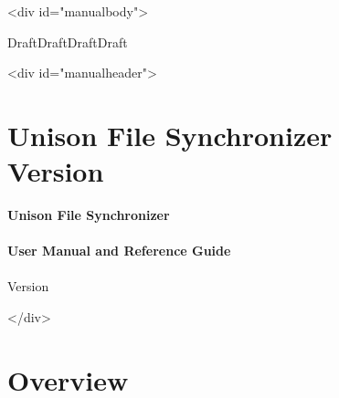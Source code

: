 \documentclass{article}
\begin{document}
\ifhevea\begin{rawhtml}<div id="manualbody">\end{rawhtml}\fi

\ifhevea\else\bigskip\fi%
\ifdraft%
\begin{center}%
{\Huge \ifhevea\red\fi DraftDraftDraftDraft}%
\end{center}%
\ifhevea\else \bigskip \fi
\fi

\ifhevea\begin{rawhtml}<div id="manualheader">\end{rawhtml}%
\else \thispagestyle{empty}
\fi%
%
\iftextversion
  \section*{Unison File Synchronizer 
  \\
  Version
  \unisonversion 
  }
\else%
  \ifhevea\else \vspace*{2in} \fi%
  \begin{center}%
  \Huge{\ifhevea\black\else\bf \fi Unison File  Synchronizer}%
  \ifhevea \\ \else \\[2ex] \fi%
  \huge {\ifhevea\black\else\bf \fi User Manual and Reference Guide}%
  \ifhevea \\ \else \\[6ex] \fi%
  \LARGE%
  Version \unisonversion \\ %
  \end{center}%
\fi%
%
%
\ifhevea\begin{rawhtml}</div>\end{rawhtml}\fi

\ifhevea\else\newpage\fi 
\TABLEOFCONTENTS
\ifhevea\else\newpage\fi

\ifhevea\else\iftextversion\else \section*{Overview}\fi\fi



\ifhevea\else\bigskip\fi

\end{document}

